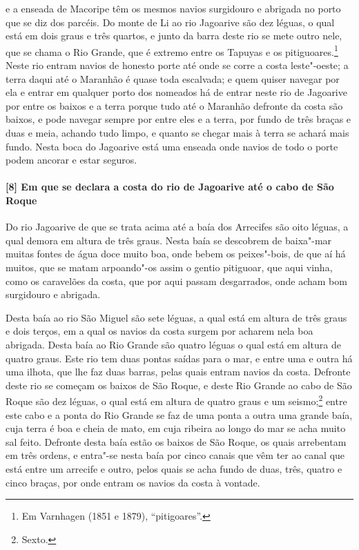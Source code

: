 e a enseada de Macoripe têm os mesmos navios surgidouro e abrigada no porto que se diz dos
parcéis. Do monte de Li ao rio Jagoarive são dez léguas, o qual está em dois graus e três
quartos, e junto da barra deste rio se mete outro nele, que se chama o Rio Grande, que é
extremo entre os Tapuyas e os pitiguoares.\footnote{ Em Varnhagen (1851 e 1879),
``pitigoares''.} Neste rio entram navios de honesto porte até onde se corre a costa
leste"-oeste; a terra daqui até o Maranhão é quase toda escalvada; e quem quiser navegar
por ela e entrar em qualquer porto dos nomeados há de entrar neste rio de Jagoarive por
entre os baixos e a terra porque tudo até o Maranhão defronte da costa são baixos, e pode
navegar sempre por entre eles e a terra, por fundo de três braças e duas e meia, achando
tudo limpo, e quanto se chegar mais à terra se achará mais fundo. Nesta boca do Jagoarive
está uma enseada onde navios de todo o porte podem ancorar e estar seguros.

\paragraph{[8] Em que se declara a costa do rio de Jagoarive até o cabo de São Roque} \quad
Do rio Jagoarive de que se trata acima até a baía dos Arrecifes são oito léguas, a qual
demora em altura de três graus. Nesta baía se descobrem de baixa"-mar muitas fontes de água
doce muito boa, onde bebem os peixes"-bois, de que aí há muitos, que se matam arpoando"-os
assim o gentio pitiguoar, que aqui vinha, como os caravelões da costa, que por aqui passam
desgarrados, onde acham bom surgidouro e abrigada.

Desta baía ao rio São Miguel são sete léguas, a qual está em altura de três graus e dois
terços, em a qual os navios da costa surgem por acharem nela boa abrigada. Desta baía ao
Rio Grande são quatro léguas o qual está em altura de quatro graus. Este rio tem duas
pontas saídas para o mar, e entre uma e outra há uma ilhota, que lhe faz duas barras,
pelas quais entram navios da costa. Defronte deste rio se começam os baixos de São Roque,
e deste Rio Grande ao cabo de São Roque são dez léguas, o qual está em altura de quatro
graus e um seismo;\footnote{ Sexto.} entre este cabo e a ponta do Rio Grande se faz de uma
ponta a outra uma grande baía, cuja terra é boa e cheia de mato, em cuja ribeira ao longo
do mar se acha muito sal feito. Defronte desta baía estão os baixos de São Roque, os quais
arrebentam em três ordens, e entra"-se nesta baía por cinco canais que vêm ter ao canal que
está entre um arrecife e outro, pelos quais se acha fundo de duas, três, quatro e cinco
braças, por onde entram os navios da costa à vontade.

